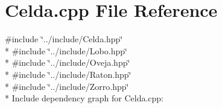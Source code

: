 \section{Celda.\+cpp File Reference}
\label{_celda_8cpp}
{\ttfamily \#include \char`\"{}../include/\+Celda.\+hpp\char`\"{}}\\*
{\ttfamily \#include \char`\"{}../include/\+Lobo.\+hpp\char`\"{}}\\*
{\ttfamily \#include \char`\"{}../include/\+Oveja.\+hpp\char`\"{}}\\*
{\ttfamily \#include \char`\"{}../include/\+Raton.\+hpp\char`\"{}}\\*
{\ttfamily \#include \char`\"{}../include/\+Zorro.\+hpp\char`\"{}}\\*
Include dependency graph for Celda.\+cpp\+:

